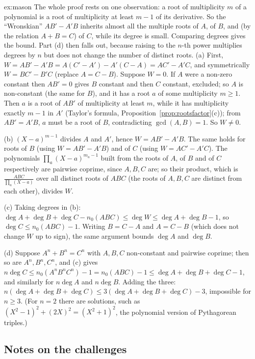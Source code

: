 \begin{solution}{ex:mason}
\idea The whole proof rests on one observation: a root of multiplicity $m$ of a polynomial is a root of multiplicity at least $m-1$ of its derivative. So the ``Wronskian'' $AB'-A'B$ inherits almost all the multiple roots of $A$, of $B$, and (by the relation $A+B=C$) of $C$, while its degree is small. Comparing degrees gives the bound. Part (d) then falls out, because raising to the $n$-th power multiplies degrees by $n$ but does not change the number of distinct roots.
\writeup (a) First, $W=AB'-A'B=A(C'-A')-A'(C-A)=AC'-A'C$, and symmetrically $W=BC'-B'C$ (replace $A=C-B$). Suppose $W=0$. If $A$ were a non-zero constant then $AB'=0$ gives $B$ constant and then $C$ constant, excluded; so $A$ is non-constant (the same for $B$), and it has a root $a$ of some multiplicity $m\ge1$. Then $a$ is a root of $AB'$ of multiplicity at least $m$, while it has multiplicity exactly $m-1$ in $A'$ (Taylor's formula, Proposition~\ref{prop:rootsfactor}(c)); from $AB'=A'B$, $a$ must be a root of $B$, contradicting $\gcd(A,B)=1$. So $W\ne0$.

(b) $(X-a)^{m-1}$ divides $A$ and $A'$, hence $W=AB'-A'B$. The same holds for roots of $B$ (using $W=AB'-A'B$) and of $C$ (using $W=AC'-A'C$). The polynomials $\prod_a(X-a)^{m_a-1}$ built from the roots of $A$, of $B$ and of $C$ respectively are pairwise coprime, since $A,B,C$ are; so their product, which is $\frac{ABC}{\prod_a(X-a)}$ over all distinct roots of $ABC$ (the roots of $A,B,C$ are distinct from each other), divides $W$.

(c) Taking degrees in (b): $\deg A+\deg B+\deg C-n_0(ABC)\le\deg W\le\deg A+\deg B-1$, so $\deg C\le n_0(ABC)-1$. Writing $B=C-A$ and $A=C-B$ (which does not change $W$ up to sign), the same argument bounds $\deg A$ and $\deg B$.

(d) Suppose $A^n+B^n=C^n$ with $A,B,C$ non-constant and pairwise coprime; then so are $A^n,B^n,C^n$, and (c) gives $n\deg C\le n_0(A^nB^nC^n)-1=n_0(ABC)-1\le\deg A+\deg B+\deg C-1$, and similarly for $n\deg A$ and $n\deg B$. Adding the three: $n(\deg A+\deg B+\deg C)\le3(\deg A+\deg B+\deg C)-3$, impossible for $n\ge3$. (For $n=2$ there are solutions, such as $(X^2-1)^2+(2X)^2=(X^2+1)^2$, the polynomial version of Pythagorean triples.)
\end{solution}

\subsection*{Notes on the challenges}

